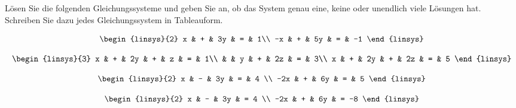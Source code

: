 Lösen Sie die folgenden Gleichungssysteme und geben Sie an,
ob das System genau eine, keine oder unendlich viele Lösungen
hat. Schreiben Sie dazu jedes Gleichungssystem in Tableauform.
\begin{teilaufgaben}
\item
\[
\begin{linsys}{2}
 x & + & 3y & = &  1\\
-x & + & 5y & = & -1
\end{linsys}
\]
\item
\[
\begin{linsys}{3}
x & + & 2y & + &  z & = & 1\\
  &   &  y & + & 2z & = & 3\\
x & + & 2y & + & 2z & = & 5 
\end{linsys}
\]
\item
\[
\begin{linsys}{2}
  x & - & 3y & = & 4 \\
-2x & + & 6y & = & 5
\end{linsys}
\]
\item
\[
\begin{linsys}{2}
  x & - & 3y & =  4 \\
-2x & + & 6y & = -8
\end{linsys}
\]
\end{teilaufgaben}


